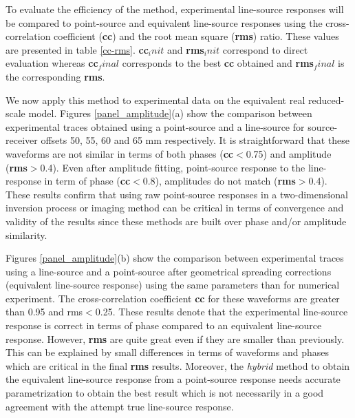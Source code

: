 \documentclass[manuscript,revised]{geophysics}
\newcommand{\twod}{two-dimensional }
\begin{document}
\noindent To evaluate the efficiency of the method, experimental line-source responses will be compared to point-source and equivalent line-source responses using the cross-correlation coefficient (\textbf{cc}) and the root mean square (\textbf{rms}) ratio. These values are presented in table \ref{cc-rms}. \textbf{cc}$_init$ and \textbf{rms}$_init$ correspond to direct evaluation whereas \textbf{cc}$_final$ corresponds to the best \textbf{cc} obtained and \textbf{rms}$_final$ is the corresponding \textbf{rms}.

\noindent We now apply this method to experimental data on the equivalent real reduced-scale model. Figures \ref{panel_amplitude}(a) show the comparison between experimental traces obtained using a point-source and a line-source for source-receiver offsets 50, 55, 60 and 65 mm respectively. It is straightforward that these waveforms are not similar in terms of both phases (\textbf{cc}$<$0.75) and amplitude (\textbf{rms}$>$0.4). Even after amplitude fitting, point-source response to the line-response in term of phase (\textbf{cc}$<$0.8), amplitudes do not match (\textbf{rms}$>$0.4). These results confirm that using raw point-source responses in a \twod inversion process or imaging method can be critical in terms of convergence and validity of the results since these methods are built over phase and/or amplitude similarity.

\noindent Figures \ref{panel_amplitude}(b) show the comparison between experimental traces using a line-source and a point-source after geometrical spreading corrections (equivalent line-source response) using the same parameters than for numerical experiment. The cross-correlation coefficient \textbf{cc} for these waveforms are greater than 0.95 and rms$<$0.25. These results denote that the experimental line-source response is correct in terms of phase compared to an equivalent line-source response. However, \textbf{rms} are quite great even if they are smaller than previously. This can be explained by small differences in terms of waveforms and phases which are critical in the final \textbf{rms} results. Moreover, the \textit{hybrid} method to obtain the equivalent line-source response from a point-source response needs accurate parametrization to obtain the best result which is not necessarily in a good agreement with the attempt true line-source response.   
\end{document}
